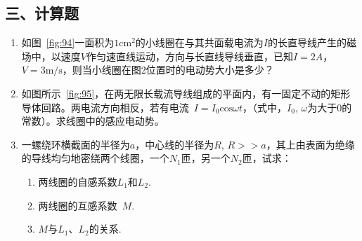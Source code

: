 \subsection*{三、计算题}
\begin{enumerate}
    \item 如图~\ref{fig:94}一面积为$1\mathrm{cm}^2$的小线圈在与其共面载电流为$I$的长直导线产生的磁场中，以速度$V$作匀速直线运动，方向与长直线导线垂直，已知$I=2A$，$V=3\mathrm{m/s}$，则当小线圈在图2位置时的电动势大小是多少？
    \item 如图所示~\ref{fig:95}，在两无限长载流导线组成的平面内，有一固定不动的矩形导体回路。两电流方向相反，若有电流~$I=I_0\mathrm{cos}\omega t$，（式中，$I_0$, $\omega$为大于0的常数）。求线圈中的感应电动势。
    \item 一螺绕环横截面的半径为$a$，中心线的半径为$R$, $R>>a$，其上由表面为绝缘的导线均匀地密绕两个线圈，一个$N_1$匝，另一个$N_2$匝，试求：
    \begin{enumerate}[label=(\arabic*)]
        \item 两线圈的自感系数$L_1$和$L_2$.
        \item 两线圈的互感系数~$M$.
        \item $M$与$L_1$、$L_2$的关系.
    \end{enumerate}
\end{enumerate}